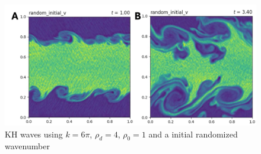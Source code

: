 \documentclass{article}
\begin{document}

\begin{figure}[htbp]
    \centering
    \includegraphics[width=\textwidth]{images/kh2.png}
    \captionsetup{width=0.8\textwidth}
    \caption{KH waves using $k = 6\pi$, \(\rho_{d} = 4\), \(\rho_{0} = 1\)
    and a initial randomized wavenumber}
    \label{fig:kh2}
\end{figure}
\end{document}

